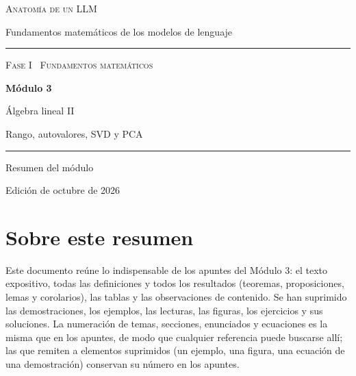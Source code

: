 \documentclass[11pt,a4paper,twoside,openany]{book}
\begin{document}
\frontmatter
\begin{titlepage}
\centering
\vspace*{2.5cm}
{\large\scshape Anatomía de un LLM}\par
\vspace{0.4cm}
{\normalsize Fundamentos matemáticos de los modelos de lenguaje}\par
\vspace{2.2cm}
\rule{\textwidth}{0.8pt}\par\vspace{0.5cm}
{\small\scshape Fase I \textperiodcentered\ Fundamentos matemáticos}\par\vspace{0.3cm}
{\Huge\bfseries Módulo 3\par}\vspace{0.3cm}
{\LARGE Álgebra lineal II\par}\vspace{0.2cm}
{\large Rango, autovalores, SVD y PCA\par}
\vspace{0.5cm}\rule{\textwidth}{0.4pt}\par
\vspace{1.6cm}
{\large Resumen del módulo}\par
\vfill
{\small Edición de octubre de 2026}\par
\end{titlepage}

\chapter*{Sobre este resumen}

Este documento reúne lo indispensable de los apuntes del Módulo 3: el texto expositivo, todas las definiciones y todos los resultados (teoremas, proposiciones, lemas y corolarios), las tablas y las observaciones de contenido. Se han suprimido las demostraciones, los ejemplos, las lecturas, las figuras, los ejercicios y sus soluciones. La numeración de temas, secciones, enunciados y ecuaciones es la misma que en los apuntes, de modo que cualquier referencia puede buscarse allí; las que remiten a elementos suprimidos (un ejemplo, una figura, una ecuación de una demostración) conservan su número en los apuntes.
\end{document}
